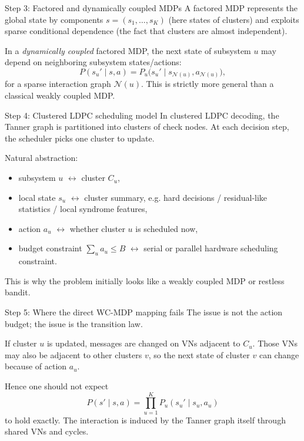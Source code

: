 \documentclass[aspectratio=169,professionalfonts]{beamer}
\begin{document}
\begin{frame}{Step 3: Factored and dynamically coupled MDPs}
A factored MDP represents the global state by components $s=(s_1,\dots,s_K)$ (here states of clusters) and exploits sparse conditional dependence (the fact that clusters are almost independent).

\vspace{0.4em}
In a \emph{dynamically coupled} factored MDP, the next state of subsystem $u$ may depend on neighboring subsystem states/actions:
\[
P(s_u' \mid s,a) = P_u\bigl(s_u'\mid s_{\mathcal N(u)}, a_{\mathcal N(u)}\bigr),
\]
for a sparse interaction graph $\mathcal N(u)$. This is strictly more general than a classical weakly coupled MDP.
\end{frame}

\begin{frame}{Step 4: Clustered LDPC scheduling model}
In clustered LDPC decoding, the Tanner graph is partitioned into clusters of check nodes. At each decision step, the scheduler picks one cluster to update.

\vspace{0.4em}
Natural abstraction:
\begin{itemize}
  \item subsystem $u$ $\leftrightarrow$ cluster $C_u$,
  \item local state $s_u$ $\leftrightarrow$ cluster summary, e.g. hard decisions / residual-like statistics / local syndrome features,
  \item action $a_u$ $\leftrightarrow$ whether cluster $u$ is scheduled now,
  \item budget constraint $\sum_u a_u \le B$ $\leftrightarrow$ serial or parallel hardware scheduling constraint.
\end{itemize}
This is why the problem initially looks like a weakly coupled MDP or restless bandit.
\end{frame}

\begin{frame}{Step 5: Where the direct WC-MDP mapping fails}
The issue is not the action budget; the issue is the transition law.

\vspace{0.4em}
If cluster $u$ is updated, messages are changed on VNs adjacent to $C_u$. Those VNs may also be adjacent to other clusters $v$, so the next state of cluster $v$ can change because of action $a_u$.

\vspace{0.4em}
Hence one should not expect
\[
P(s'\mid s,a)=\prod_{u=1}^K P_u(s_u'\mid s_u,a_u)
\]
to hold exactly. The interaction is induced by the Tanner graph itself through shared VNs and cycles.
\end{frame}
\end{document}
